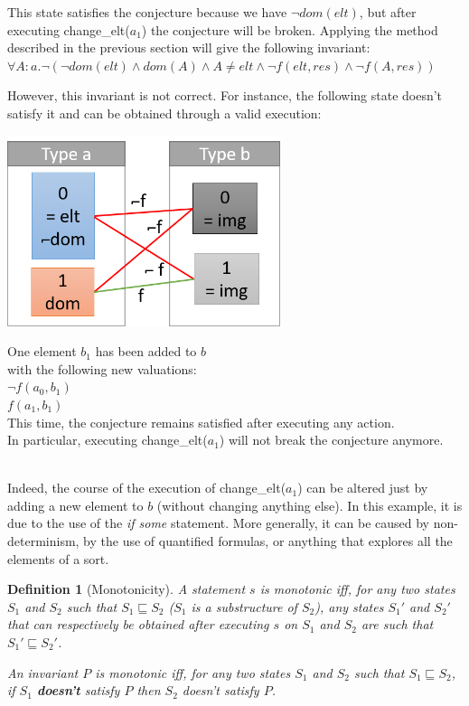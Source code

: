 \documentclass[11pt,a4paper,oldfontcommands,openany]{memoir}
\newtheorem*{definition}{Definition}
\begin{document}
    This state satisfies the conjecture because we have \(\neg dom(elt)\), but after executing change_elt(\(a_1\)) the conjecture will be broken.
    Applying the method described in the previous section will give the following invariant:
    \(\forall A:a. \neg(\neg dom(elt) \land dom(A) \land A \neq elt \land \neg f(elt,res) \land \neg f(A,res))\)

    However, this invariant is not correct. For instance, the following state doesn't satisfy it and can be obtained through a valid execution:

    \begin{minipage}{0.45\textwidth}
        \includegraphics[width=8cm]{NonMonotonicExValid}
    \end{minipage} \hfill
    \begin{minipage}{0.45\textwidth}
        One element \(b_1\) has been added to \(b\)\\
        with the following new valuations:\\
        \(\neg f(a_0,b_1)\)\\
        \(f(a_1,b_1)\)\\
        This time, the conjecture remains satisfied after executing any action.\\
        In particular, executing change_elt(\(a_1\)) will not break the conjecture anymore.
    \end{minipage}\\

    Indeed, the course of the execution of change_elt(\(a_1\)) can be altered just by adding a new element to \(b\)
    (without changing anything else). In this example, it is due to the use of the \textit{if some} statement.
    More generally, it can be caused by non-determinism, by the use of quantified formulas, or anything that explores all the elements of a sort.

    \begin{definition}[Monotonicity]
        A statement \(s\) is monotonic iff, for any two states \(S_1\) and \(S_2\) such that \(S_1 \sqsubseteq S_2\)
        (\(S_1\) is a substructure of \(S_2\)), any states \(S_1'\) and \(S_2'\) that can respectively be obtained after executing
        \(s\) on \(S_1\) and \(S_2\) are such that \(S_1' \sqsubseteq S_2'\).

        An invariant \(P\) is monotonic iff, for any two states \(S_1\) and \(S_2\) such that \(S_1 \sqsubseteq S_2\),
        if \(S_1\) \textbf{doesn't} satisfy \(P\) then \(S_2\) doesn't satisfy \(P\).
    \end{definition}
\end{document}
